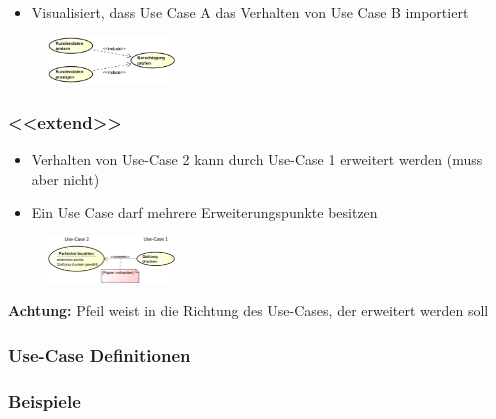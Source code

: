 \documentclass[11pt, a4paper]{article}
\begin{document}
\begin{itemize}
    \item Visualisiert, dass Use Case A das Verhalten von Use Case B importiert
\end{itemize}

\begin{figure}[h]
    \includegraphics[width=0.3\textwidth]{UseCase-11.png}
    \label{fig:UseCase-11}
\end{figure}

\raggedright \subsubsection{<<extend>>}

\begin{itemize}
    \item Verhalten von Use-Case 2 kann durch Use-Case 1 erweitert werden (muss aber nicht)
    \item Ein Use Case darf mehrere Erweiterungspunkte besitzen
\end{itemize}

\begin{figure}[h]
    \includegraphics[width=0.3\textwidth]{UseCase-12.png}
    \label{fig:UseCase-12}
\end{figure}

\textbf{Achtung:} Pfeil weist in die Richtung des Use-Cases, der erweitert werden soll


\subsubsection{Use-Case Definitionen}

\subsubsection*{Beispiele}
\end{document}

